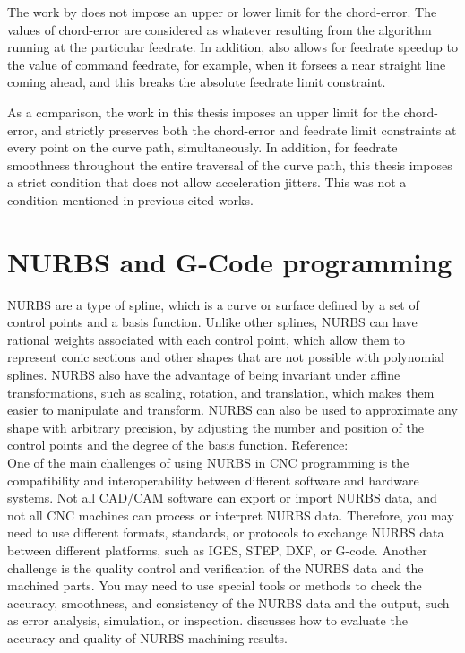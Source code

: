 The work by \cite{Zhong-etal:2018} does not impose an upper or lower limit for the chord-error. The values of chord-error are considered as whatever resulting from the algorithm running at the particular feedrate. In addition, \cite{Zhong-etal:2018} also allows for feedrate speedup to the value of command feedrate, for example, when it forsees a near straight line coming ahead, and this breaks the absolute feedrate limit constraint. 

\clearpage
\pagebreak

As a comparison, the work in this thesis imposes an upper limit for the chord-error, and strictly preserves both the chord-error and feedrate limit constraints at every point on the curve path, simultaneously. In addition, for feedrate smoothness throughout the entire traversal of the curve path, this thesis imposes a strict condition that does not allow acceleration jitters. This was not a condition mentioned in previous cited works. 



\section{NURBS and G-Code programming}

NURBS are a type of spline, which is a curve or surface defined by a set of control points and a basis function. Unlike other splines, NURBS can have rational weights associated with each control point, which allow them to represent conic sections and other shapes that are not possible with polynomial splines. NURBS also have the advantage of being invariant under affine transformations, such as scaling, rotation, and translation, which makes them easier to manipulate and transform. NURBS can also be used to approximate any shape with arbitrary precision, by adjusting the number and position of the control points and the degree of the basis function. Reference: \cite{CollabCNC:2023A}\\

One of the main challenges of using NURBS in CNC programming is the compatibility and interoperability between different software and hardware systems. Not all CAD/CAM software can export or import NURBS data, and not all CNC machines can process or interpret NURBS data. Therefore, you may need to use different formats, standards, or protocols to exchange NURBS data between different platforms, such as IGES, STEP, DXF, or G-code. Another challenge is the quality control and verification of the NURBS data and the machined parts. You may need to use special tools or methods to check the accuracy, smoothness, and consistency of the NURBS data and the output, such as error analysis, simulation, or inspection. \cite{CollabCNC:2023B} discusses how to evaluate the accuracy and quality of NURBS machining results.\\

